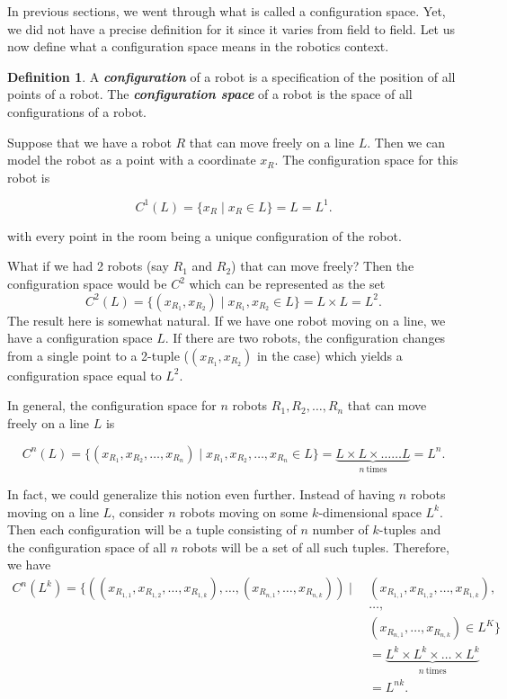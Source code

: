 \documentclass[12pt]{article}
\theoremstyle{definition}
\newtheorem*{definition}{Definition}
\begin{document}
In previous sections, we went through what is called a configuration space.
Yet, we did not have a precise definition for it since it varies from field to field.
Let us now define what a configuration space means in the robotics context.

\begin{definition}
\cite{12} A \textit{\textbf{configuration}} of a robot is a specification of the position of all points of a robot.
The \textit{\textbf{configuration space}} of a robot is the space of all configurations of a robot.
\end{definition}

Suppose that we have a robot $R$ that can move freely on a line $L$. Then we can model the robot as
a point with a coordinate $x_R$. The configuration space for this robot is

$$C^1(L) = \{x_R \mid x_R \in L\} = L = L^1.$$

with every point in the room being a unique configuration of the robot.

\bigskip

What if we had 2 robots (say $R_1$ and $R_2$) that can move freely?
Then the configuration space would be $C^2$ which can be represented as the set
$$C^2(L) = \{(x_{R_1}, x_{R_2}) \mid x_{R_1}, x_{R_2} \in L\} = L \times L = L^2.$$
The result here is somewhat natural. If we have one robot moving on a line, we have a configuration
space $L$. If there are two robots, the configuration changes from a single point to a 2-tuple
($(x_{R_1}, x_{R_2})$ in the case) which yields a configuration space equal to $L^2$.

\bigskip

In general, the configuration space for $n$ robots $R_1, R_2, \dots, R_n$ that can move freely on a line $L$ is

$$C^n(L) = \{(x_{R_1}, x_{R_2}, \dots, x_{R_n}) \mid x_{R_1}, x_{R_2}, \dots, x_{R_n} \in L\} = \underbrace{L \times L \times \dots \dots L}_{n \ \text{times}} = L^n.$$

In fact, we could generalize this notion even further. Instead of having
$n$ robots moving on a line $L$, consider $n$ robots moving on some $k$-dimensional space $L^k$.
Then each configuration will be a tuple consisting of $n$ number of $k$-tuples and the configuration
space of all $n$ robots will be a set of all such tuples. Therefore, we have
\begin{equation*}
    \begin{split}
    C^n(L^k) = \{((x_{R_{1, 1}}, x_{R_{1, 2}}, \dots, x_{R_{1, k}}), \dots, (x_{R_{n, 1}}, \dots, x_{R_{n, k}})) \mid \ & (x_{R_{1, 1}}, x_{R_{1, 2}}, \dots, x_{R_{1, k}}),\\
    &\dots,\\
    &(x_{R_{n, 1}}, \dots, x_{R_{n, k}}) \in L^K\}\\
    &= \underbrace{L^k \times L^k \times \dots \times L^k}_{n \ \text{times}}\\
    &= L^{nk}.
    \end{split}
\end{equation*}
\end{document}
